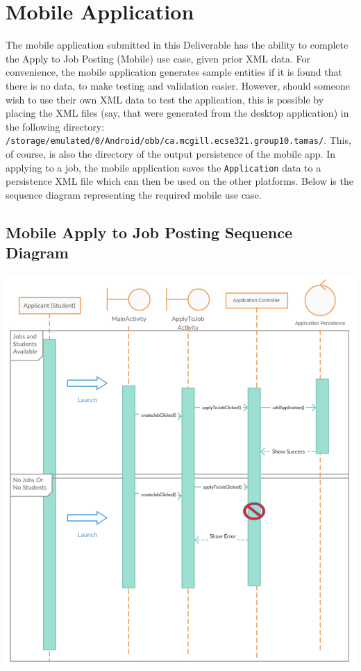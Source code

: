 \documentclass[12pt]{report}
\begin{document}
\section{Mobile Application}
The mobile application submitted in this Deliverable has the ability to complete the Apply to Job
Posting (Mobile) use case, given prior XML data. For convenience, the mobile application generates
sample entities if it is found that there is no data, to make testing and validation easier.
However, should someone wish to use their own XML data to test the application, this is possible by
placing the XML files (say, that were generated from the desktop application) in the following
directory: \texttt{/storage/emulated/0/Android/obb/ca.mcgill.ecse321.group10.tamas/}. This, of
course, is also the directory of the output persistence of the mobile app. In applying to a job, the
mobile application saves the \texttt{Application} data to a persistence XML file which can then be
used on the other platforms. Below is the sequence diagram representing the required mobile use
case.
\subsection{Mobile Apply to Job Posting Sequence Diagram}
\includegraphics[scale=0.90]{model/SEQUENCE/apply_mobileSEQUENCE}
\end{document}
